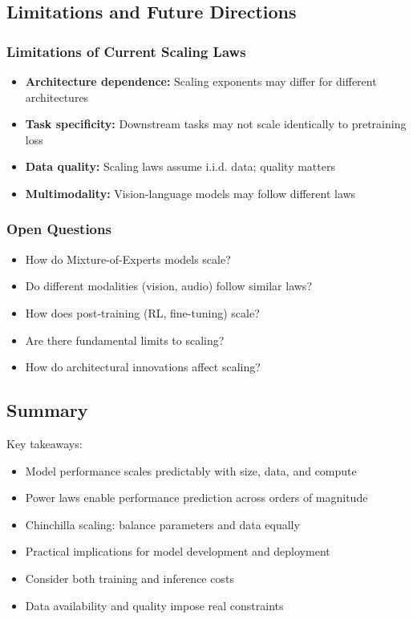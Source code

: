 \documentclass[class=article,crop=false]{standalone}
\begin{document}
\subsection{Limitations and Future Directions}
\label{sec:scaling:future}

\subsubsection{Limitations of Current Scaling Laws}

\begin{itemize}
  \item \textbf{Architecture dependence:} Scaling exponents may differ for different architectures
  \item \textbf{Task specificity:} Downstream tasks may not scale identically to pretraining loss
  \item \textbf{Data quality:} Scaling laws assume i.i.d. data; quality matters
  \item \textbf{Multimodality:} Vision-language models may follow different laws
\end{itemize}

\subsubsection{Open Questions}

\begin{itemize}
  \item How do Mixture-of-Experts models scale?
  \item Do different modalities (vision, audio) follow similar laws?
  \item How does post-training (RL, fine-tuning) scale?
  \item Are there fundamental limits to scaling?
  \item How do architectural innovations affect scaling?
\end{itemize}

\subsection{Summary}
\label{sec:scaling:summary}

Key takeaways:
\begin{itemize}
  \item Model performance scales predictably with size, data, and compute
  \item Power laws enable performance prediction across orders of magnitude
  \item Chinchilla scaling: balance parameters and data equally
  \item Practical implications for model development and deployment
  \item Consider both training and inference costs
  \item Data availability and quality impose real constraints
\end{itemize}
\end{document}
